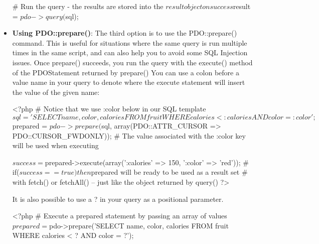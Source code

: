 \documentclass{report}
\begin{document}
\begin{itemize}
\begin{bashcode}
                # Run the query - the results are stored into the $result object on success
                $result = $pdo->query($sql);
            \end{bashcode}
        \item \textbf{Using PDO::prepare()}: The third option is to use the PDO::prepare() command. This is useful for situations where the same query is run multiple times in the same script, and can also help you to avoid some SQL Injection issues. Once prepare() succeeds, you run the query with the execute() method of the PDOStatement returned by prepare()
            \bigbreak \noindent 
            You can use a colon before a value name in your query to denote where the execute statement will insert the value of the given name:
            \bigbreak \noindent 
            \begin{bashcode}
                <?php
                    # Notice that we use :color below in our SQL template
                    $sql = 'SELECT name, color, calories
                    FROM fruit
                    WHERE calories < :calories AND color = :color';

                    $prepared = $pdo->prepare($sql, array(PDO::ATTR_CURSOR => PDO::CURSOR_FWDONLY));
                    # The value associated with the :color key will be used when executing

                    $success = $prepared->execute(array(':calories' => 150, ':color' => 'red'));
                    # if($success==true) then $prepared will be ready to be used as a result set
                    # with fetch() or fetchAll() -- just like the object returned by query()
                ?>
            \end{bashcode}
            \bigbreak \noindent 
            It is also possible to use a ? in your query as a positional parameter.
            \bigbreak \noindent 
            \begin{bashcode}
                <?php
                    # Execute a prepared statement by passing an array of values
                    $prepared = $pdo->prepare('SELECT name, color, calories
                                            FROM fruit
                                            WHERE calories < ? AND color = ?');


\end{bashcode}
\end{itemize}
\end{document}
